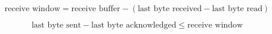 \begin{equation*}
  \text{receive window} = \text{receive buffer} - \left( \text{last byte received} - \text{last byte read} \right)
\end{equation*}

\begin{equation*}
  \text{last byte sent} - \text{last byte acknowledged} \le \text{receive window}
\end{equation*}